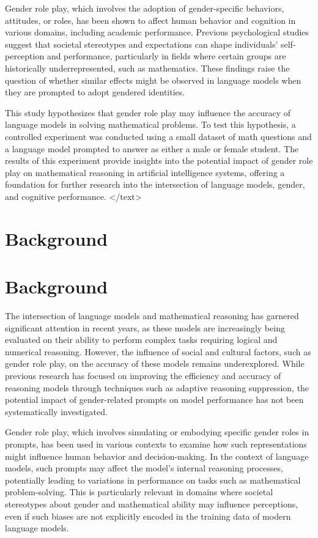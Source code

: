 \documentclass{article}
\begin{document}
Gender role play, which involves the adoption of gender-specific behaviors, attitudes, or roles, has been shown to affect human behavior and cognition in various domains, including academic performance. Previous psychological studies suggest that societal stereotypes and expectations can shape individuals' self-perception and performance, particularly in fields where certain groups are historically underrepresented, such as mathematics. These findings raise the question of whether similar effects might be observed in language models when they are prompted to adopt gendered identities. 

This study hypothesizes that gender role play may influence the accuracy of language models in solving mathematical problems. To test this hypothesis, a controlled experiment was conducted using a small dataset of math questions and a language model prompted to answer as either a male or female student. The results of this experiment provide insights into the potential impact of gender role play on mathematical reasoning in artificial intelligence systems, offering a foundation for further research into the intersection of language models, gender, and cognitive performance.
</text>
\section{Background}
\section*{Background}

The intersection of language models and mathematical reasoning has garnered significant attention in recent years, as these models are increasingly being evaluated on their ability to perform complex tasks requiring logical and numerical reasoning. However, the influence of social and cultural factors, such as gender role play, on the accuracy of these models remains underexplored. While previous research has focused on improving the efficiency and accuracy of reasoning models through techniques such as adaptive reasoning suppression, the potential impact of gender-related prompts on model performance has not been systematically investigated. 

Gender role play, which involves simulating or embodying specific gender roles in prompts, has been used in various contexts to examine how such representations might influence human behavior and decision-making. In the context of language models, such prompts may affect the model's internal reasoning processes, potentially leading to variations in performance on tasks such as mathematical problem-solving. This is particularly relevant in domains where societal stereotypes about gender and mathematical ability may influence perceptions, even if such biases are not explicitly encoded in the training data of modern language models. 
\end{document}
